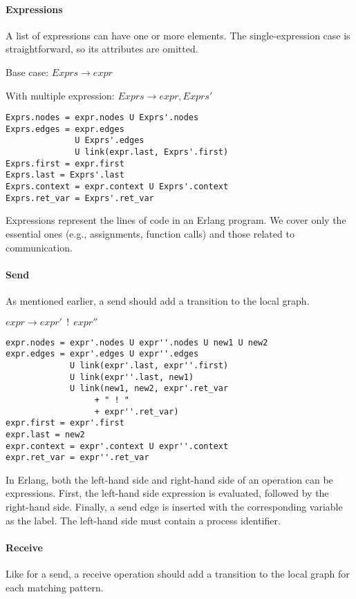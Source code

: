 \paragraph{Expressions}  
A list of expressions can have one or more elements. The single-expression  
case is straightforward, so its attributes are omitted.  

\bigskip

\noindent Base case: $Exprs \to expr$

\noindent With multiple expression: $Exprs \to expr,Exprs'$

\begin{verbatim}
Exprs.nodes = expr.nodes U Exprs'.nodes
Exprs.edges = expr.edges 
              U Exprs'.edges 
              U link(expr.last, Exprs'.first)
Exprs.first = expr.first
Exprs.last = Exprs'.last
Exprs.context = expr.context U Exprs'.context
Exprs.ret_var = Exprs'.ret_var
\end{verbatim}

Expressions represent the lines of code in an Erlang program.  
We cover only the essential ones (e.g., assignments, function calls)  
and those related to communication.  

\paragraph{Send}   
As mentioned earlier, a send should add a transition to the local graph.  

\bigskip

\noindent $expr \to expr'\ \ !\ \ expr''$

\begin{verbatim}
expr.nodes = expr'.nodes U expr''.nodes U new1 U new2
expr.edges = expr'.edges U expr''.edges
             U link(expr'.last, expr''.first)
             U link(expr''.last, new1)
             U link(new1, new2, expr'.ret_var 
                  + " ! " 
                  + expr''.ret_var)
expr.first = expr'.first
expr.last = new2
expr.context = expr'.context U expr''.context
expr.ret_var = expr''.ret_var
\end{verbatim}

In Erlang, both the left-hand side and right-hand side of an operation  
can be expressions. First, the left-hand side expression is evaluated,  
followed by the right-hand side. Finally, a send edge is inserted with  
the corresponding variable as the label. The left-hand side must contain  
a process identifier.  

\paragraph{Receive}  
Like for a send, a receive operation should add a transition to  
the local graph for each matching pattern.  

